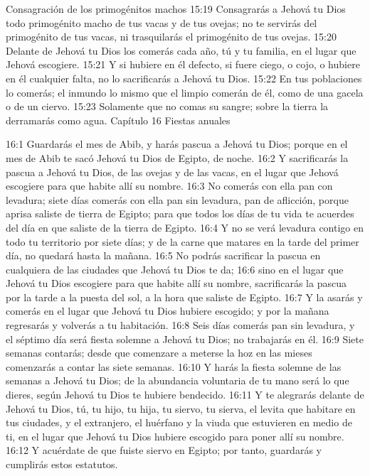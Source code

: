 Consagración de los primogénitos machos  
15:19 Consagrarás a Jehová tu Dios todo primogénito macho de tus vacas y de tus ovejas; no te servirás del primogénito de tus vacas, ni trasquilarás el primogénito de tus ovejas.  
15:20 Delante de Jehová tu Dios los comerás cada año, tú y tu familia, en el lugar que Jehová escogiere.  
15:21 Y si hubiere en él defecto, si fuere ciego, o cojo, o hubiere en él cualquier falta, no lo sacrificarás a Jehová tu Dios.  
15:22 En tus poblaciones lo comerás; el inmundo lo mismo que el limpio comerán de él, como de una gacela o de un ciervo.  
15:23 Solamente que no comas su sangre; sobre la tierra la derramarás como agua.  
Capítulo 16
Fiestas anuales   

16:1 Guardarás el mes de Abib, y harás pascua  a Jehová tu Dios; porque en el mes de Abib te sacó Jehová tu Dios de Egipto, de noche.  
16:2 Y sacrificarás la pascua a Jehová tu Dios, de las ovejas y de las vacas, en el lugar que Jehová escogiere para que habite allí su nombre.  
16:3 No comerás con ella pan con levadura; siete días comerás con ella pan sin levadura, pan de aflicción, porque aprisa saliste de tierra de Egipto; para que todos los días de tu vida te acuerdes del día en que saliste de la tierra de Egipto.  
16:4 Y no se verá levadura contigo en todo tu territorio por siete días; y de la carne que matares en la tarde del primer día, no quedará hasta la mañana.  
16:5 No podrás sacrificar la pascua en cualquiera de las ciudades que Jehová tu Dios te da;  
16:6 sino en el lugar que Jehová tu Dios escogiere para que habite allí su nombre, sacrificarás la pascua por la tarde a la puesta del sol, a la hora que saliste de Egipto.  
16:7 Y la asarás y comerás en el lugar que Jehová tu Dios hubiere escogido; y por la mañana regresarás y volverás a tu habitación.  
16:8 Seis días comerás pan sin levadura, y el séptimo día será fiesta solemne a Jehová tu Dios; no trabajarás en él.  
16:9 Siete semanas contarás; desde que comenzare a meterse la hoz en las mieses comenzarás a contar las siete semanas.  
16:10 Y harás la fiesta solemne de las semanas  a Jehová tu Dios; de la abundancia voluntaria de tu mano será lo que dieres, según Jehová tu Dios te hubiere bendecido.  
16:11 Y te alegrarás delante de Jehová tu Dios, tú, tu hijo, tu hija, tu siervo, tu sierva, el levita que habitare en tus ciudades, y el extranjero, el huérfano y la viuda que estuvieren en medio de ti, en el lugar que Jehová tu Dios hubiere escogido para poner allí su nombre.  
16:12 Y acuérdate de que fuiste siervo en Egipto; por tanto, guardarás y cumplirás estos estatutos.  
